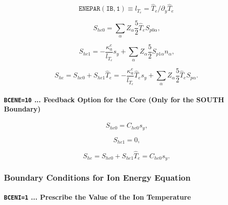 \documentclass[11pt]{article}
\begin{document}
\begin{equation*}
\mathtt{ENEPAR(IB,1)}\equiv l_{T_{e}}=\widehat{T}_{e}/\partial_{y}\widehat
{T}_{e}
\end{equation*}

\bigskip

\begin{equation}
S_{he0}=\sum_{\alpha}Z_{\alpha}\frac{5}{2}\widehat{T}_{e}S_{p0\alpha}\text{,}
\label{c222}
\end{equation}

\begin{equation}
S_{he1}=-\frac{\kappa_{a}^{e}}{l_{T_{e}}}s_{y}+\sum_{\alpha}Z_{\alpha}\frac
{5}{2}S_{p1\alpha}n_{\alpha}\text{,}   \label{c223}
\end{equation}

\begin{equation}
S_{he}=S_{he0}+S_{he1}\widehat{T}_{e}=-\frac{\kappa_{a}^{e}}{l_{T_{e}}}%
\widehat{T}_{e}s_{y}+\sum_{\alpha}Z_{\alpha}\frac{5}{2}\widehat{T}%
_{e}S_{p\alpha}\text{.}   \label{c224}
\end{equation}

\bigskip

\paragraph{\texttt{BCENE=10} ... Feedback Option for the Core (Only for the
SOUTH Boundary)}

\bigskip

\begin{equation}
S_{he0}=C_{he0}s_{y}\text{,}   \label{c225}
\end{equation}

\begin{equation}
S_{he1}=0\text{,}   \label{c226}
\end{equation}

\begin{equation}
S_{he}=S_{he0}+S_{he1}\widehat{T}_{e}=C_{he0}s_{y}\text{.}   \label{c227}
\end{equation}

\bigskip

\subsubsection{Boundary Conditions for Ion Energy Equation}

\bigskip

\paragraph{\texttt{BCENI=1} ... Prescribe the Value of the Ion Temperature}
\end{document}
